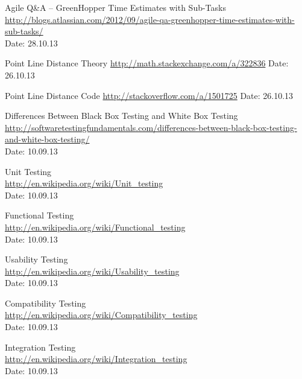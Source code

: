 \begin{thebibliography}{99}
	Agile Q\&A – GreenHopper Time Estimates with Sub-Tasks \\
	\href{http://blogs.atlassian.com/2012/09/agile-qa-greenhopper-time-estimates-with-sub-tasks/}{http://blogs.atlassian.com/2012/09/agile-qa-greenhopper-time-estimates-with-sub-tasks/} \\
	Date: 28.10.13

	Point Line Distance Theory\newline
	\href {http://math.stackexchange.com/a/322836}{http://math.stackexchange.com/a/322836}\newline
	Date: 26.10.13

	Point Line Distance Code\newline
	\href {http://stackoverflow.com/a/1501725}{http://stackoverflow.com/a/1501725}\newline
	Date: 26.10.13

	Differences Between Black Box Testing and White Box Testing \\
	\href {http://softwaretestingfundamentals.com/differences-between-black-box-testing-and-white-box-testing/}{http://softwaretestingfundamentals.com/differences-between-black-box-testing-and-white-box-testing/} \\
	Date: 10.09.13

	Unit Testing \\
	\href {http://en.wikipedia.org/wiki/Unit_testing}{http://en.wikipedia.org/wiki/Unit\_testing} \\
	Date: 10.09.13

	Functional Testing \\
	\href {http://en.wikipedia.org/wiki/Functional_testing}{http://en.wikipedia.org/wiki/Functional\_testing} \\
	Date: 10.09.13

	Usability Testing \\
	\href {http://en.wikipedia.org/wiki/Usability_testing}{http://en.wikipedia.org/wiki/Usability\_testing} \\
	Date: 10.09.13

	Compatibility Testing \\
	\href {http://en.wikipedia.org/wiki/Compatibility_testing}{http://en.wikipedia.org/wiki/Compatibility\_testing} \\
	Date: 10.09.13

	Integration Testing \\
	\href{http://en.wikipedia.org/wiki/Integration_testing}{http://en.wikipedia.org/wiki/Integration\_testing} \\
	Date: 10.09.13


\end{thebibliography}
